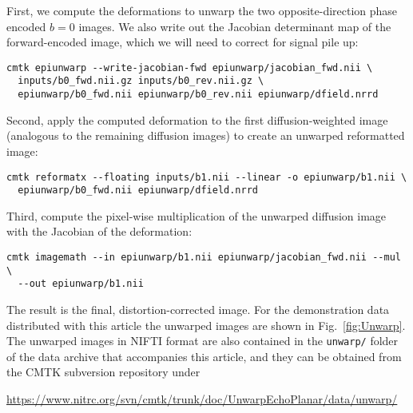 \documentclass{InsightArticle}
\begin{document}
First, we compute the deformations to unwarp the two opposite-direction phase
encoded $b=0$ images. We also write out the Jacobian determinant map of the
forward-encoded image, which we will need to correct for signal pile up:
\begin{verbatim}
cmtk epiunwarp --write-jacobian-fwd epiunwarp/jacobian_fwd.nii \
  inputs/b0_fwd.nii.gz inputs/b0_rev.nii.gz \
  epiunwarp/b0_fwd.nii epiunwarp/b0_rev.nii epiunwarp/dfield.nrrd
\end{verbatim}
Second, apply the computed deformation to the first diffusion-weighted image
(analogous to the remaining diffusion images) to create an unwarped
reformatted image:
\begin{verbatim}
cmtk reformatx --floating inputs/b1.nii --linear -o epiunwarp/b1.nii \
  epiunwarp/b0_fwd.nii epiunwarp/dfield.nrrd
\end{verbatim}
Third, compute the pixel-wise multiplication of the unwarped diffusion image
with the Jacobian of the deformation:
\begin{verbatim}
cmtk imagemath --in epiunwarp/b1.nii epiunwarp/jacobian_fwd.nii --mul \
  --out epiunwarp/b1.nii
\end{verbatim}
The result is the final, distortion-corrected image. For the demonstration
data distributed with this article the unwarped images are shown in
Fig.~\ref{fig:Unwarp}. The unwarped images in NIFTI format are also
contained in the \verb|unwarp/| folder of the data archive that accompanies
this article, and they can be obtained from the CMTK subversion repository
under

\centerline{\url{https://www.nitrc.org/svn/cmtk/trunk/doc/UnwarpEchoPlanar/data/unwarp/}}
\end{document}
